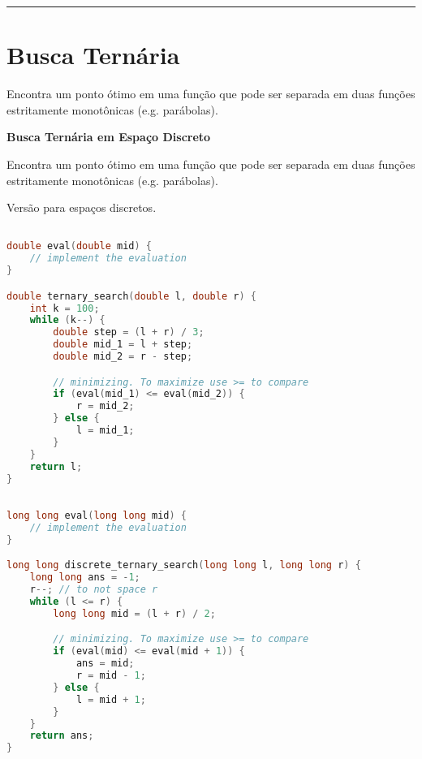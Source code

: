\documentclass[11pt, a4paper, twoside]{book}
\begin{document}
\hfill

\rule{\textwidth}{0.4pt}

\section{Busca Ternária}



Encontra um ponto ótimo em uma função que pode ser separada em duas funções estritamente monotônicas (e.g. parábolas).





\textbf{Busca Ternária em Espaço Discreto} 



Encontra um ponto ótimo em uma função que pode ser separada em duas funções estritamente monotônicas (e.g. parábolas).

Versão para espaços discretos.




\hfill

\begin{multicols}{2}
\begin{lstlisting}[language=C++]

double eval(double mid) {
    // implement the evaluation
}

double ternary_search(double l, double r) {
    int k = 100;
    while (k--) {
        double step = (l + r) / 3;
        double mid_1 = l + step;
        double mid_2 = r - step;

        // minimizing. To maximize use >= to compare
        if (eval(mid_1) <= eval(mid_2)) {
            r = mid_2;
        } else {
            l = mid_1;
        }
    }
    return l;
}
\end{lstlisting}
\end{multicols}

\hfill

\begin{lstlisting}[language=C++]

long long eval(long long mid) {
    // implement the evaluation
}

long long discrete_ternary_search(long long l, long long r) {
    long long ans = -1;
    r--; // to not space r
    while (l <= r) {
        long long mid = (l + r) / 2;

        // minimizing. To maximize use >= to compare
        if (eval(mid) <= eval(mid + 1)) {
            ans = mid;
            r = mid - 1;
        } else {
            l = mid + 1;
        }
    }
    return ans;
}
\end{lstlisting}
\end{document}
